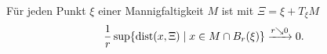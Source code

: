 \documentclass[skript.tex]{subfiles}
\begin{document}
	\begin{theorem}[Tangentialebene]
		Für jeden Punkt $\xi$ einer Mannigfaltigkeit $M$ ist mit $\Xi = \xi + T_\xi M$
		\[
			\frac{1}{r} \sup\{\operatorname{dist}(x,\Xi) \mid x\in M\cap B_{r}(\xi)\} \xrightarrow{r \searrow 0} 0.
		\]
	\end{theorem}
	\begin{center}
	\end{center}
\end{document}
